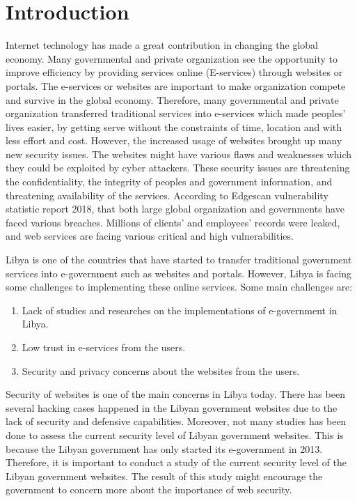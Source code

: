 \documentclass[conference]{IEEEtran}
\begin{document}
\section{Introduction}

Internet technology has made a great contribution in changing the
global economy. Many governmental and private organization see the
opportunity to improve efficiency by providing services online
(E-services) through websites or
portals\cite{zhao2010opportunities}\cite{ismailova2017web}.  The
e-services or websites are important to make organization compete and
survive in the global economy. Therefore, many governmental and
private organization transferred traditional services into e-services
which made peoples’ lives easier, by getting serve without the
constraints of time, location and with less effort and
cost\cite{reddick2012channel}.  However, the increased usage of
websites brought up many new security
issues\cite{felderer2016security}. The websites might have various
flaws and weaknesses which they could be exploited by cyber
attackers. These security issues are threatening the confidentiality,
the integrity of peoples and government information, and threatening
availability of the
services\cite{al2015security,yusof2013evaluating,kasimin2013using}. According
to Edgescan vulnerability statistic report 2018, that both large
global organization and governments have faced various
breaches. Millions of clients’ and employees’ records were leaked, and
web services are facing various critical and high vulnerabilities.

Libya is one of the countries that have started to transfer
traditional government services into e-government such as websites and
portals. However, Libya is facing some challenges to implementing
these online services. Some main challenges
are\cite{ahmed2011potential}\cite{elaswad2016identity}:
\begin{enumerate}
\item Lack of studies and researches on the implementations of e-government in Libya.
\item Low trust in e-services from the users.
\item Security and privacy concerns about the websites from the users.
\end{enumerate}

Security of websites is one of the main concerns in
Libya today\cite{gebba2012government}\cite{elmansori2017factors}.
There has been several hacking cases happened in the Libyan government
websites due to the lack of security and defensive
capabilities\cite{tehrani2013cyber,yusof2011cyber}. Moreover, not many studies has been done to assess the current security level of
Libyan government websites\cite{ihmouda2013penetration}. This is because the Libyan government has only started its e-government in 2013. Therefore, it
is important to conduct a study of the current security level of the Libyan government websites. The result of this study might encourage
the government to concern more about the importance of web security\cite{forti2017new}.
\end{document}
